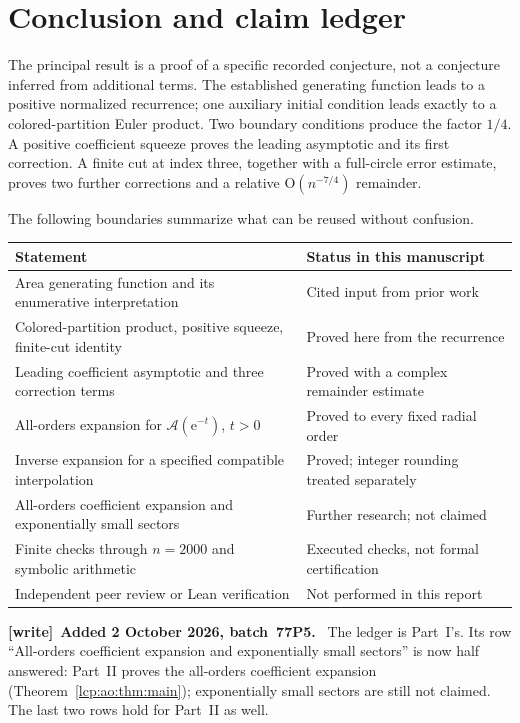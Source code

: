 \documentclass[11pt]{article}
\numberwithin{equation}{section}
\theoremstyle{definition}\newtheorem{definition}[theorem]{Definition}
\theoremstyle{remark}\newtheorem{remark}[theorem]{Remark}
\newcommand{\OO}{\mathrm O}
\newcommand{\Acal}{\mathcal A}
\newcommand{\ee}{\mathrm e}
\newenvironment{writenote}[1][]{\par\smallskip\begingroup\small
 \noindent\textbf{[write]}\if\relax\detokenize{#1}\relax\else~\textbf{#1.}\fi\ }%
 {\par\endgroup\smallskip}
\begin{document}
\section{Conclusion and claim ledger}
The principal result is a proof of a specific recorded conjecture, not
a conjecture inferred from additional terms. The established generating
function leads to a positive normalized recurrence; one auxiliary initial
condition leads exactly to a colored-partition Euler product. Two boundary
conditions produce the factor $1/4$. A positive coefficient squeeze proves
the leading asymptotic and its first correction. A finite cut at index
three, together with a full-circle error estimate, proves two further
corrections and a relative $\OO(n^{-7/4})$ remainder.

The following boundaries summarize what can be reused without confusion.
\begin{center}
\begin{tabular}{p{}p{}}
\toprule
Statement & Status in this manuscript\\
\midrule
Area generating function and its enumerative interpretation
& Cited input from prior work\\
Colored-partition product, positive squeeze, finite-cut identity
& Proved here from the recurrence\\
Leading coefficient asymptotic and three correction terms
& Proved with a complex remainder estimate\\
All-orders expansion for $\Acal(\ee^{-t})$, $t>0$
& Proved to every fixed radial order\\
Inverse expansion for a specified compatible interpolation
& Proved; integer rounding treated separately\\
All-orders coefficient expansion and exponentially small sectors
& Further research; not claimed\\
Finite checks through $n=2000$ and symbolic arithmetic
& Executed checks, not formal certification\\
Independent peer review or Lean verification
& Not performed in this report\\
\bottomrule
\end{tabular}
\end{center}
\begin{writenote}[Added 2 October 2026, batch~77P5]
The ledger is Part~I's. Its row ``All-orders coefficient expansion and
exponentially small sectors'' is now half answered: Part~II proves the
all-orders coefficient expansion (Theorem~\ref{lcp:ao:thm:main});
exponentially small sectors are still not claimed. The last two rows hold
for Part~II as well.
\end{writenote}
\end{document}
